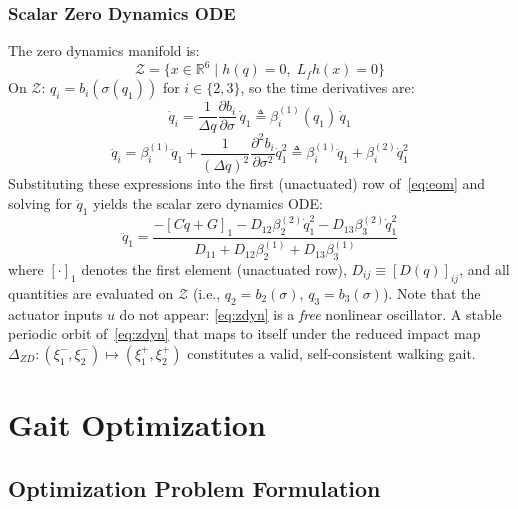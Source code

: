 \documentclass[conference]{IEEEtran}
\begin{document}
\subsubsection{Scalar Zero Dynamics ODE}
The zero dynamics manifold is:
\begin{equation}
    \mathcal{Z} = \bigl\{x \in \mathbb{R}^6 \;\big|\; h(q) = 0,\; L_f h(x) = 0\bigr\}
\end{equation}
On $\mathcal{Z}$: $q_i = b_i(\sigma(q_1))$ for $i \in \{2,3\}$, so the time derivatives are:
\begin{equation}
    \dot{q}_i = \frac{1}{\Delta q}\frac{\partial b_i}{\partial \sigma}\,\dot{q}_1 \triangleq \beta_i^{(1)}(q_1)\,\dot{q}_1
\end{equation}
\begin{equation}
    \ddot{q}_i = \beta_i^{(1)}\ddot{q}_1 + \frac{1}{(\Delta q)^2}\frac{\partial^2 b_i}{\partial \sigma^2}\dot{q}_1^2 \triangleq \beta_i^{(1)}\ddot{q}_1 + \beta_i^{(2)}\dot{q}_1^2
\end{equation}
Substituting these expressions into the first (unactuated) row of~\eqref{eq:eom} and solving for $\ddot{q}_1$ yields the scalar zero dynamics ODE:
\begin{equation}
    \ddot{q}_1 = \frac{-[C\dot{q}+G]_1 - D_{12}\beta_2^{(2)}\dot{q}_1^2 - D_{13}\beta_3^{(2)}\dot{q}_1^2}
                      {D_{11} + D_{12}\beta_2^{(1)} + D_{13}\beta_3^{(1)}} \label{eq:zdyn}
\end{equation}
where $[\cdot]_1$ denotes the first element (unactuated row), $D_{ij} \equiv [D(q)]_{ij}$, and all quantities are evaluated on $\mathcal{Z}$ (i.e., $q_2 = b_2(\sigma)$, $q_3 = b_3(\sigma)$). Note that the actuator inputs $u$ do not appear: \eqref{eq:zdyn} is a \emph{free} nonlinear oscillator. A stable periodic orbit of~\eqref{eq:zdyn} that maps to itself under the reduced impact map $\Delta_{ZD}: (\xi_1^-, \xi_2^-) \mapsto (\xi_1^+, \xi_2^+)$ constitutes a valid, self-consistent walking gait.

\section{Gait Optimization} \label{sec:opt}

\subsection{Optimization Problem Formulation}
\end{document}
